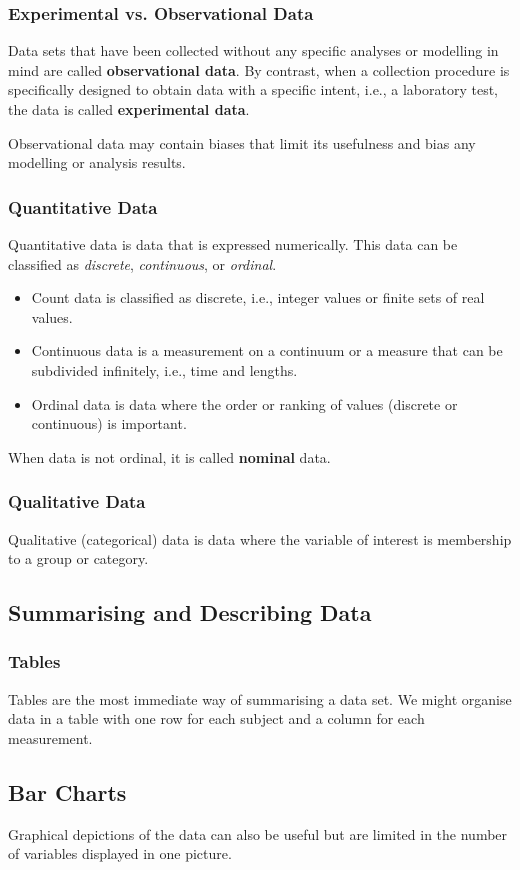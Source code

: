 \documentclass{article}
\begin{document}
\subsubsection{Experimental vs. Observational Data}
Data sets that have been collected without any specific analyses or modelling in mind are called \textbf{observational data}.
By contrast, when a collection procedure is specifically designed to obtain data with a specific intent,
i.e., a laboratory test, the data is called \textbf{experimental data}.

Observational data may contain biases that limit its usefulness and bias any modelling or analysis results.
\subsubsection{Quantitative Data}
Quantitative data is data that is expressed numerically.
This data can be classified as \textit{discrete}, \textit{continuous}, or \textit{ordinal}.
\begin{itemize}
    \item Count data is classified as discrete, i.e., integer values or finite sets
    of real values.
    \item Continuous data is a measurement on a continuum or a measure that can be subdivided infinitely,
    i.e., time and lengths.
    \item Ordinal data is data where the order or ranking of values (discrete or continuous) is important.
\end{itemize}
When data is not ordinal, it is called \textbf{nominal} data.
\subsubsection{Qualitative Data}
Qualitative (categorical) data is data where the variable of interest is
membership to a group or category.
\subsection{Summarising and Describing Data}
\subsubsection{Tables}
Tables are the most immediate way of summarising a data set.
We might organise data in a table with one row for each subject and a column for each measurement.
\subsection{Bar Charts}
Graphical depictions of the data can also be useful but are limited in the number of variables displayed in one picture.
\end{document}
